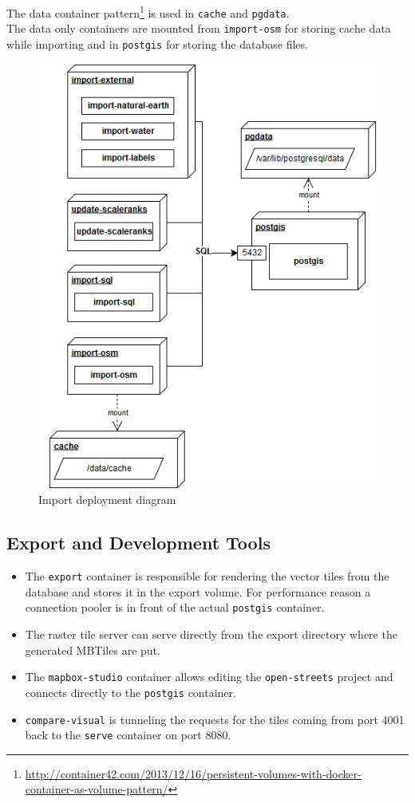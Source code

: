 The data container pattern\footnote{\url{http://container42.com/2013/12/16/persistent-volumes-with-docker-container-as-volume-pattern/}} is used in \texttt{cache} and \texttt{pgdata}. \\
The data only containers are mounted from \texttt{import-osm} for storing cache data while importing and in \texttt{postgis} for storing the database files.

\begin{figure}[H]
\centering
  \includegraphics[scale=0.6]{images/deployment_diagram_import.png}
  \caption{Import deployment diagram}
\end{figure}

\newpage
\subsection{Export and Development Tools}

\begin{itemize}
\item The \texttt{export} container is responsible for rendering the vector tiles from the database and stores it in the export volume. For performance reason a connection pooler is in front of the actual \texttt{postgis} container.
\item The raster tile server can serve directly from the export directory where the generated MBTiles are put.
\item The \texttt{mapbox-studio} container allows editing the \texttt{open-streets} project and connects directly to the \texttt{postgis} container.
\item \texttt{compare-visual} is tunneling the requests for the tiles coming from port 4001 back to the \texttt{serve} container on port 8080.
\end{itemize}

